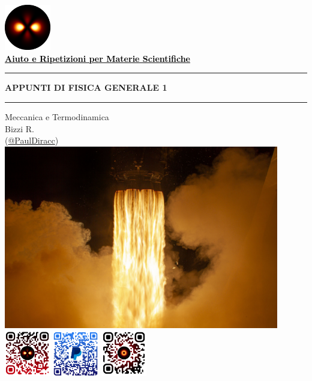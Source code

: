 \begin{titlepage}
\begin{center}
\href{\Grouplink}{\includegraphics[width=0.15\textwidth]{../logo.png}}\\
\huge{\textbf{\href{\Grouplink}{
    \textcolor{black}{Aiuto e Ripetizioni per Materie Scientifiche}}}
}\\
\vspace{25mm}
\hrule
\vspace{2.5mm}
\Huge{\textbf{APPUNTI DI FISICA GENERALE 1}}
\vspace{2.5mm}
\hrule
\vspace{3.5mm}
\Large{Meccanica e Termodinamica}
\\[2.5mm]
\normalsize{
    Bizzi R.\\
    \textcolor[RGB]{\hashcolor}{(\href{\Riccardolink}{\textcolor[RGB]{\hashcolor}{@PaulDiracc}})}
}
\\[8mm]
\href{https://www.esa.int/ESA_Multimedia/Images/2021/04/Dragon_fire}{
    \includegraphics[width=0.9\textwidth]{images/cop.jpg}}
\\[15mm]
\href{\Grouplink}{\includegraphics[width=0.15\textwidth]{../group.png}}\qquad
\href{\PayPallink}{\includegraphics[width=0.15\textwidth]{../PayPal.png}}\qquad
\href{\Riccardolink}{\includegraphics[width=0.15\textwidth]{../me.png}}
\end{center}
\end{titlepage}
